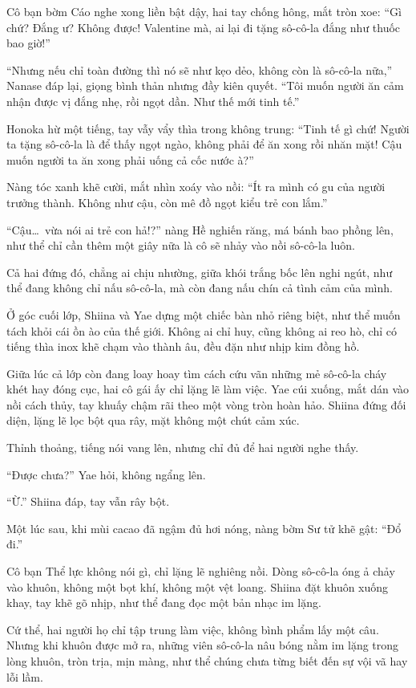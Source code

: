 \documentclass[../main.tex]{subfiles}
\begin{document}
Cô bạn bờm Cáo nghe xong liền bật dậy, hai tay chống hông, mắt tròn xoe: ``Gì chứ? Đắng ư? Không được! Valentine mà, ai lại đi tặng sô-cô-la đắng như thuốc bao giờ!''

``Nhưng nếu chỉ toàn đường thì nó sẽ như kẹo dẻo, không còn là sô-cô-la nữa,'' Nanase đáp lại, giọng bình thản nhưng đầy kiên quyết. ``Tôi muốn người ăn cảm nhận được vị đắng nhẹ, rồi ngọt dần. Như thế mới tinh tế.''

Honoka hừ một tiếng, tay vẫy vẩy thìa trong không trung: ``Tinh tế gì chứ! Người ta tặng sô-cô-la là để thấy ngọt ngào, không phải để ăn xong rồi nhăn mặt! Cậu muốn người ta ăn xong phải uống cả cốc nước à?''

Nàng tóc xanh khẽ cười, mắt nhìn xoáy vào nồi: ``Ít ra mình có gu của người trưởng thành. Không như cậu, còn mê đồ ngọt kiểu trẻ con lắm.''

``Cậu\dots\ vừa nói ai trẻ con hả!?'' nàng Hề nghiến răng, má bánh bao phồng lên, như thể chỉ cần thêm một giây nữa là cô sẽ nhảy vào nồi sô-cô-la luôn.

Cả hai đứng đó, chẳng ai chịu nhường, giữa khói trắng bốc lên nghi ngút, như thể đang không chỉ nấu sô-cô-la, mà còn đang nấu chín cả tình cảm của mình.

Ở góc cuối lớp, Shiina và Yae dựng một chiếc bàn nhỏ riêng biệt, như thể muốn tách khỏi cái ồn ào của thế giới. Không ai chỉ huy, cũng không ai reo hò, chỉ có tiếng thìa inox khẽ chạm vào thành âu, đều đặn như nhịp kim đồng hồ.

Giữa lúc cả lớp còn đang loay hoay tìm cách cứu vãn những mẻ sô-cô-la cháy khét hay đóng cục, hai cô gái ấy chỉ lặng lẽ làm việc. Yae cúi xuống, mắt dán vào nồi cách thủy, tay khuấy chậm rãi theo một vòng tròn hoàn hảo. Shiina đứng đối diện, lặng lẽ lọc bột qua rây, mặt không một chút cảm xúc.

Thỉnh thoảng, tiếng nói vang lên, nhưng chỉ đủ để hai người nghe thấy.

``Được chưa?''  Yae hỏi, không ngẩng lên.

``Ừ.''  Shiina đáp, tay vẫn rây bột.

Một lúc sau, khi mùi cacao đã ngậm đủ hơi nóng, nàng bờm Sư tử khẽ gật: ``Đổ đi.''

Cô bạn Thể lực không nói gì, chỉ lặng lẽ nghiêng nồi. Dòng sô-cô-la óng ả chảy vào khuôn, không một bọt khí, không một vệt loang. Shiina đặt khuôn xuống khay, tay khẽ gõ nhịp, như thể đang đọc một bản nhạc im lặng.

Cứ thể, hai người họ chỉ tập trung làm việc, không bình phẩm lấy một câu. Nhưng khi khuôn được mở ra, những viên sô-cô-la nâu bóng nằm im lặng trong lòng khuôn, tròn trịa, mịn màng, như thể chúng chưa từng biết đến sự vội vã hay lỗi lầm.
\end{document}
